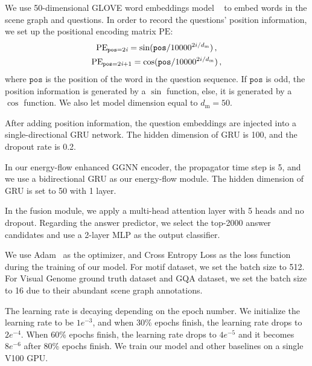 \documentclass[letterpaper]{article} %
\begin{document}
We use 50-dimensional GLOVE word embeddings model ~\cite{pennington-etal-2014-glove} to embed words in the scene graph and questions. In order to record the questions' position information, we set up the positional encoding matrix $\textrm{PE}$:
\begin{gather}\notag
    \textrm{PE}_{\texttt{pos}=2\emph{i}} = \sin(\texttt{pos}/10000^{2i/d_{\textrm{m}}}) \, ,\\
    \textrm{PE}_{\texttt{pos}=2\emph{i}+1} = \cos(\texttt{pos}/10000^{2i/d_{\textrm{m}}}) \, , \notag
\end{gather}
where $\texttt{pos}$ is the position of the word in the question sequence. 
If $\texttt{pos}$ is odd, the position information is generated by a $\sin$ function, else, it is generated by a $\cos$ function. 
We also let model dimension equal to $d_{\textrm{m}}=50$.

After adding position information, the question embeddings are injected into a single-directional GRU network. 
The hidden dimension of GRU is 100, and the dropout rate is 0.2.

In our energy-flow enhanced GGNN encoder, the propagator time step is 5, and we use a bidirectional GRU as our energy-flow module. The hidden dimension of GRU is set to 50 with 1 layer. 

In the fusion module, we apply a multi-head attention layer with 5 heads and no dropout. 
Regarding the answer predictor, we select the top-2000 answer candidates and use a 2-layer MLP as the output classifier.

We use Adam~\cite{kingma2014adam} as the optimizer, and Cross Entropy Loss as the loss function during the training of our model. 
For motif dataset, we set the batch size to 512. For Visual Genome ground truth dataset and GQA dataset, we set the batch size to 16 due to their abundant scene graph annotations.

The learning rate is decaying depending on the epoch number. We initialize the learning rate to be $1e^{-3}$, and when 30\% epochs finish, the learning rate drops to $2e^{-4}$. When 60\% epochs finish, the learning rate drops to $4e^{-5}$ and it becomes $8e^{-6}$ after 80\% epochs finish. We train our model and other baselines on a single V100 GPU.

\end{document}
